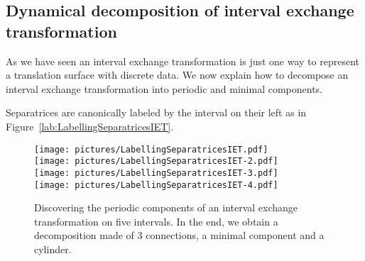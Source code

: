 \documentclass{article}
\begin{document}
\subsection{Dynamical decomposition of interval exchange transformation}

As we have seen an interval exchange transformation is just one way to represent
a translation surface with discrete data. We now explain how to decompose an
interval exchange transformation into periodic and minimal components.

Separatrices are canonically labeled by the interval on their left as in
Figure~\ref{lab:LabellingSeparatricesIET}.
\begin{figure}[!ht]
\begin{center}
\texttt{[image: pictures/LabellingSeparatricesIET.pdf]} \\
\texttt{[image: pictures/LabellingSeparatricesIET-2.pdf]} \\
\texttt{[image: pictures/LabellingSeparatricesIET-3.pdf]} \\
\texttt{[image: pictures/LabellingSeparatricesIET-4.pdf]}
\end{center}
\caption{Discovering the periodic components of an interval exchange transformation
on five intervals. In the end, we obtain a decomposition made of 3 connections,
a minimal component and a cylinder.}
\end{figure}
\end{document}
